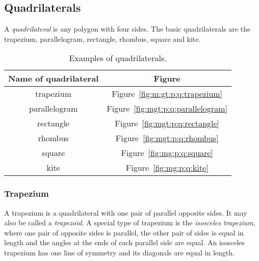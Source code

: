 \documentclass[10pt,a4paper,titlepage,twoside,openright]{report}
\begin{document}
{\begin{enumerate}
\begin{center}

\end{center}
\end{enumerate}
}

\subsection{Quadrilaterals}
A \textit{quadrilateral} is any polygon with four sides. The basic quadrilaterals are the trapezium, parallelogram, rectangle, rhombus, square and kite. 

\begin{table}[htb]
\begin{center}
\begin{tabular}{|c|c|}\hline
Name of quadrilateral & Figure \\\hline\hline
trapezium & Figure~\ref{fig:m:gt:p:q:trapezium} \\\hline
parallelogram &Figure~\ref{fig:mgt:p:q:parallelogram} \\\hline
rectangle &Figure~\ref{fig:mgt:p:q:rectangle} \\\hline
rhombus &Figure~\ref{fig:mgt:p:q:rhombus} \\\hline
square &Figure~\ref{fig:mg:p:q:square} \\\hline
kite &Figure~\ref{fig:mg:p:q:kite} \\\hline
\end{tabular}
\caption{Examples of quadrilaterals.}
\label{tab:mg:p:q:quadrilateral}
\end{center}
\end{table}

\subsubsection{Trapezium}
A trapezium is a quadrilateral with one pair of parallel opposite sides. It may also be called a \textit{trapezoid}. A special type of trapezium is the \textit{isosceles trapezium}, where one pair of opposite sides is parallel, the other pair of sides is equal in length and the angles at the ends of each parallel side are equal. An isosceles trapezium has one line of symmetry and its diagonals are equal in length. 
\end{document}
